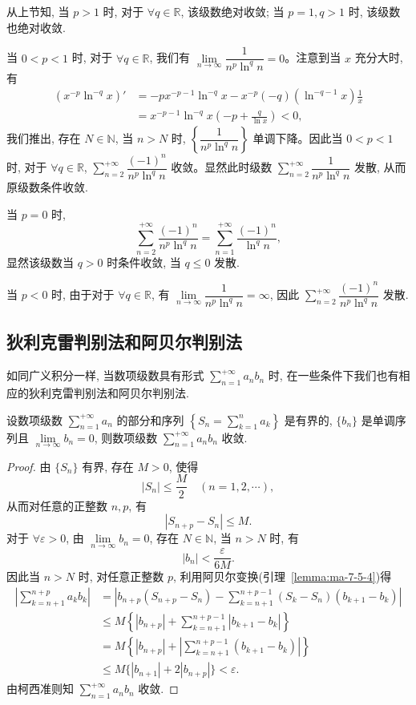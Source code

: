 \begin{solve}
从上节知, 当 $p>1$ 时, 对于 $\forall q\in\mathbb{R}$, 该级数绝对收敛; 当 $p=1,q>1$ 时, 该级数也绝对收敛.

当 $0<p<1$ 时, 对于 $\forall q\in\mathbb{R}$, 我们有 $\lim\limits_{n\to\infty}\dfrac1{n^p\ln^q n}=0$。注意到当 $x$ 充分大时, 有
\[
\begin{aligned}
  (x^{-p}\ln^{-q}x)'
  &=-px^{-p-1}\ln^{-q}x-x^{-p}(-q)(\ln^{-q-1}x)\frac1x\\
  &=x^{-p-1}\ln^{-q}x\left(-p+\frac{q}{\ln x}\right)<0,
\end{aligned}
\]
我们推出, 存在 $N\in\mathbb{N}$, 当 $n>N$ 时, $\left\{\dfrac1{n^p\ln^q n}\right\}$ 单调下降。因此当 $0<p<1$ 时, 对于 $\forall q\in\mathbb{R}$, $\sum\limits_{n=2}^{+\infty}\dfrac{(-1)^n}{n^p\ln^q n}$ 收敛。显然此时级数 $\sum\limits_{n=2}^{+\infty}\dfrac1{n^p\ln^q n}$ 发散, 从而原级数条件收敛.

当 $p=0$ 时,
\[
  \sum_{n=2}^{+\infty}\frac{(-1)^n}{n^p\ln^q n}
  =\sum_{n=1}^{+\infty}\frac{(-1)^n}{\ln^q n},
\]
显然该级数当 $q>0$ 时条件收敛, 当 $q\leq0$ 发散.

当 $p<0$ 时, 由于对于 $\forall q\in\mathbb{R}$, 有 $\lim\limits_{n\to\infty}\dfrac1{n^p\ln^q n}=\infty$, 因此 $\sum\limits_{n=2}^{+\infty}\dfrac{(-1)^n}{n^p\ln^q n}$ 发散.
\end{solve}


\subsection{狄利克雷判别法和阿贝尔判别法}
\label{subsec:ma-9-3-2}

如同广义积分一样, 当数项级数具有形式 $\sum\limits_{n=1}^{+\infty}a_nb_n$ 时, 在一些条件下我们也有相应的狄利克雷判别法和阿贝尔判别法.

\begin{theorem}[{狄利克雷判别法}]\label{theorem:ma-9-3-2}
设数项级数 $\sum\limits_{n=1}^{+\infty}a_n$ 的部分和序列 $\left\{S_n=\sum\limits_{k=1}^n a_k\right\}$ 是有界的, $\{b_n\}$ 是单调序列且 $\lim\limits_{n\to\infty}b_n=0$, 则数项级数 $\sum\limits_{n=1}^{+\infty}a_nb_n$ 收敛.
\end{theorem}


\begin{proof}
由 $\{S_n\}$ 有界, 存在 $M>0$, 使得
\[
  |S_n|\leq\frac{M}{2}\quad(n=1,2,\cdots),
\]
从而对任意的正整数 $n,p$, 有
\[
  |S_{n+p}-S_n|\leq M.
\]
对于 $\forall\varepsilon>0$, 由 $\lim\limits_{n\to\infty}b_n=0$, 存在 $N\in\mathbb{N}$, 当 $n>N$ 时, 有
\[
  |b_n|<\frac{\varepsilon}{6M}.
\]
因此当 $n>N$ 时, 对任意正整数 $p$, 利用阿贝尔变换(引理~\ref{lemma:ma-7-5-4})得
\[
\begin{aligned}
  \left|\sum_{k=n+1}^{n+p}a_kb_k\right|
  &=\left|b_{n+p}(S_{n+p}-S_n)-\sum_{k=n+1}^{n+p-1}(S_k-S_n)(b_{k+1}-b_k)\right|\\
  &\leq M\left\{|b_{n+p}|+\sum_{k=n+1}^{n+p-1}|b_{k+1}-b_k|\right\}\\
  &=M\left\{|b_{n+p}|+\left|\sum_{k=n+1}^{n+p-1}(b_{k+1}-b_k)\right|\right\}\\
  &\leq M\{|b_{n+1}|+2|b_{n+p}|\}<\varepsilon.
\end{aligned}
\]
由柯西准则知 $\sum\limits_{n=1}^{+\infty}a_nb_n$ 收敛.
\end{proof}


